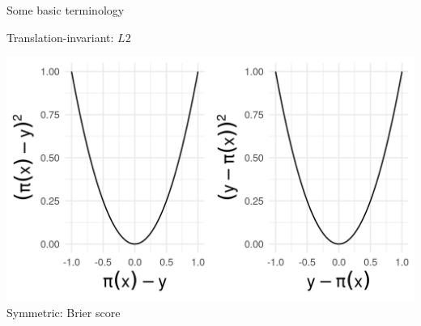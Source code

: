 \documentclass[11pt,compress,t,notes=noshow, xcolor=table]{beamer}
\begin{document}
\begin{vbframe}{Some basic terminology}
\begin{minipage}[b]{0.265\textwidth}
  \tiny \centering
  Translation-invariant: $L2$
\end{minipage}%
\begin{minipage}[b]{0.40\textwidth}
  \includegraphics[width=\textwidth]{figure/loss_symmetric}
  \tiny \centering
  Symmetric: Brier score
\end{minipage}

\end{vbframe}

\end{document}
